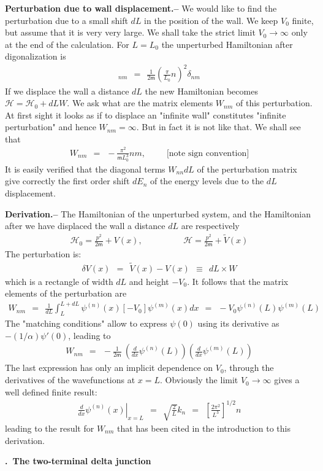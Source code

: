 \documentclass[onecolumn,fleqn, 11pt]{revtex4}
\newcommand{\mass}{\mathsf{m}}
\newcommand{\beq}{\begin{eqnarray}}
\newcommand{\eeq}{\end{eqnarray}}
\renewcommand{\thesubsection}{\arabic{subsection}}
\renewcommand{\thesubsubsection}{\arabic{subsubsection}}
\newcommand{\sheadC}[1]
{
\addtocounter{subsubsection}{1}
\vspace{5mm}
{\bf \thesubsection.\thesubsubsection \ #1}  
\nopagebreak
\phantomsection
}
\begin{document}
{\bf Perturbation due to wall displacement.-- }  
We would like to find the perturbation 
due to a small shift $dL$ in the position of the wall. 
We keep $V_0$ finite, but assume that it is very very large. 
We shall take the strict limit $V_0\rightarrow\infty$ 
only at the end of the calculation.
For $L=L_0$ the unperturbed Hamiltonian 
after digonalization is  
\beq 
[\mathcal{H}_0]_{nm} \ \ = \ \ \frac{1}{2\mass}\left( \frac{\pi}{L_0} n \right)^2 \delta_{nm} 
\eeq
If we displace the wall a distance $dL$ the new Hamiltonian 
becomes ${\mathcal{H}=\mathcal{H}_0 + dL W}$. We ask 
what are the matrix elements $W_{nm}$ of this perturbation. 
At first sight it looks as if to displace an "infinite wall" 
constitutes "infinite perturbation" and hence ${W_{nm}=\infty}$.  
But in fact it is not like that. We shall see that 
\beq 
W_{nm} \ \ = \ \  -\frac{\pi^2}{\mass L_0^3}nm, 
\ \ \ \ \ \ \ \ \ \ \ \mbox{[note sign convention]} 
\eeq
It is easily verified that the diagonal terms $W_{nn}dL$
of the perturbation matrix give correctly the first order 
shift $dE_n$ of the energy levels due to the $dL$ displacement.   

{\bf Derivation.-- }  
The Hamiltonian of the unperturbed system, and the Hamiltonian 
after we have displaced the wall a distance ${dL}$ are respectively 
\beq
\mathcal{H}_0 = \frac{p^2}{2\mass}+V(x), 
\hspace{2cm}
\mathcal{H} = \frac{p^2}{2\mass} + \tilde{V}(x)
\eeq
The perturbation is:
\beq
\delta V(x) \ \ = \ \ \tilde{V}(x) - V(x) \ \ \equiv \ \ dL \times W 
\eeq
which is a rectangle of width ${dL}$ and height ${-V_0}$.
It follows that the matrix elements of the perturbation are   
\beq 
W_{nm} 
\ \ = \ \ 
\frac{1}{dL} \int_{L}^{L+dL} \psi^{(n)}(x) [-V_0] \psi^{(m)}(x) dx 
\ \ = \ \ 
-V_0 \psi^{(n)}(L) \psi^{(m)}(L) 
\eeq
The "matching conditions" allow to express $\psi(0)$ 
using its derivative as $-(1/\alpha)\psi'(0)$, 
leading to  
\beq 
W_{nm} 
\ \  = \ \   
-\frac{1}{2\mass} \ 
\left( \frac{d}{dx} \psi^{(n)} (L) \right) 
\left( \frac{d}{dx} \psi^{(m)} (L) \right) 
\eeq
The last expression has only an implicit dependence 
on $V_0$, through the derivatives of the wavefunctions
at ${x=L}$. Obviously the limit ${V_0 \rightarrow \infty}$ 
gives a well defined finite result:
\beq
\left. \frac{d}{dx} \psi^{(n)}(x) \right|_{x=L} \ \ = \ \ \sqrt{\frac{2}{L}} k_n  \ \ = \ \ \left[\frac{2\pi^2}{L^3}\right]^{1/2}n
\eeq
leading to the result for $W_{nm}$ that has been cited 
in the introduction to this derivation. 


\sheadC{The two-terminal delta junction}
\end{document}
